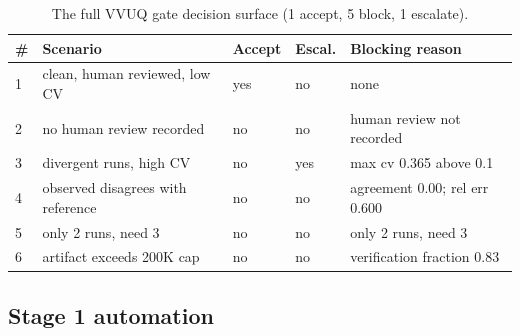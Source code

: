 \begin{table}[H]
\caption{The full VVUQ gate decision surface (1 accept, 5 block, 1 escalate).}
\label{tab:results_gate}
\centering
\begin{tabularx}{\textwidth}{C{0.6cm} L{4.2cm} C{1.3cm} C{1.3cm} >{\raggedright\arraybackslash}X}
\toprule
\textbf{\#} & \textbf{Scenario} & \textbf{Accept} & \textbf{Escal.} & \textbf{Blocking reason} \\
 & clean, human reviewed, low CV     & yes & no  & none \\
  2 & no human review recorded          & no  & no  & human review not recorded \\
  3 & divergent runs, high CV           & no  & yes & max cv 0.365 above 0.1 \\
  4 & observed disagrees with reference & no  & no  & agreement 0.00; rel err 0.600 \\
  5 & only 2 runs, need 3               & no  & no  & only 2 runs, need 3 \\
  6 & artifact exceeds 200K cap         & no  & no  & verification fraction 0.83 \\
\bottomrule
\end{tabularx}
\end{table}

\subsection{Stage 1 automation}

